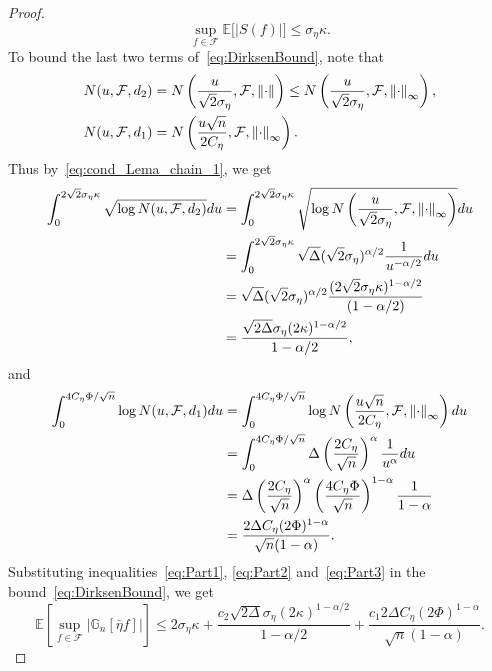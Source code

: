 \begin{proof}
\begin{equation}\label{eq:Part1}
\sup_{f\in\mathcal{F}}\mathbb{E}\big[|S(f)|\big] \le \sigma_{\eta}\kappa.
\end{equation}
To bound the last two terms of~\eqref{eq:DirksenBound}, note that
\begin{align*}
N(u, \mathcal{F}, d_2) &= N\left(\frac{u}{\sqrt{2}\sigma_{\eta}}, \mathcal{F}, \norm{\cdot}\right) \le N\left(\frac{u}{\sqrt{2}\sigma_{\eta}}, \mathcal{F}, \norm{\cdot}_{\infty}\right),\\%
N(u, \mathcal{F}, d_1) &= N\left(\frac{u\sqrt{n}}{2C_{\eta}}, \mathcal{F}, \norm{\cdot}_{\infty}\right).%
\end{align*}
Thus by~\eqref{eq:cond_Lema_chain_1}, we get
\begin{equation}\label{eq:Part2}
\begin{split}
\int_0^{2\sqrt{2}\sigma_{\eta}\kappa} \sqrt{\log N(u, \mathcal{F}, d_2)}du &= \int_0^{2\sqrt{2}\sigma_{\eta}\kappa} \sqrt{\log N\left(\frac{u}{\sqrt{2}\sigma_{\eta}}, \mathcal{F}, \left\lVert\cdot\right\rVert_{\infty}\right)}du\\
&= \int_0^{2\sqrt{2}\sigma_{\eta}\kappa} \sqrt{\Delta}(\sqrt{2}\sigma_{\eta})^{\alpha/2}\frac{1}{u^{-\alpha/2}}du\\
&= \sqrt{\Delta}(\sqrt{2}\sigma_{\eta})^{\alpha/2}\frac{(2\sqrt{2}\sigma_{\eta}\kappa)^{1 - \alpha/2}}{(1 - \alpha/2)}\\
&= \frac{\sqrt{2\Delta}\sigma_{\eta}(2\kappa)^{1 - \alpha/2}}{1 - \alpha/2},
\end{split}
\end{equation}
and
\begin{equation}\label{eq:Part3}
\begin{split}
\int_0^{4C_{\eta}\Phi/\sqrt{n}}\log N(u, \mathcal{F}, d_1)du &= \int_0^{4C_{\eta}\Phi/\sqrt{n}} \log N\left(\frac{u\sqrt{n}}{2C_{\eta}}, \mathcal{F}, \left\lVert\cdot\right\rVert_{\infty}\right)du\\
&= \int_0^{4C_{\eta}\Phi/\sqrt{n}} \Delta\left(\frac{2C_{\eta}}{\sqrt{n}}\right)^{\alpha}\frac{1}{u^{\alpha}}du\\
&= \Delta\left(\frac{2C_{\eta}}{\sqrt{n}}\right)^{\alpha}\left(\frac{4C_{\eta}\Phi}{\sqrt{n}}\right)^{1 - \alpha}\frac{1}{1 - \alpha}\\
&= \frac{2\Delta C_{\eta}(2\Phi)^{1 - \alpha}}{\sqrt{n}(1 - \alpha)}.
\end{split}
\end{equation}
Substituting inequalities~\eqref{eq:Part1}, \eqref{eq:Part2} and~\eqref{eq:Part3} in the bound~\eqref{eq:DirksenBound}, we get
\[
\mathbb{E}\left[\sup_{f\in\mathcal{F}}\left|\mathbb{G}_n[\bar{\eta} f]\right|\right] \le 2\sigma_{\eta}\kappa + \frac{c_2\sqrt{2\Delta}\sigma_{\eta}(2\kappa)^{1 - \alpha/2}}{1 - \alpha/2} + \frac{c_1 2\Delta C_{\eta}(2\Phi)^{1 - \alpha}}{\sqrt{n}(1 - \alpha)}.
\]
\end{proof}

